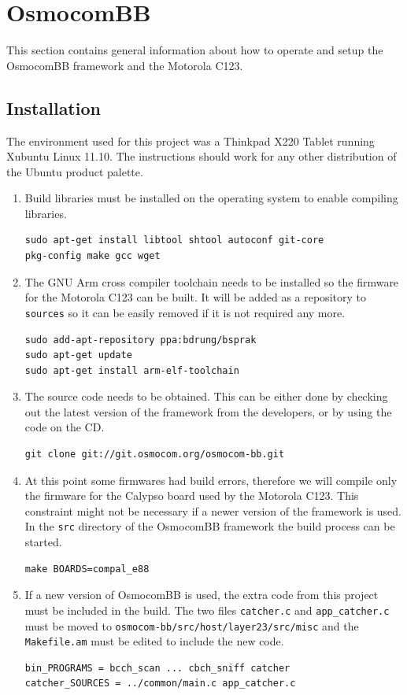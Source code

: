 \chapter{OsmocomBB}
This section contains general information about how to operate and setup the OsmocomBB framework and the Motorola C123.
\section{Installation}
\label{sec:osmo_install}
The environment used for this project was a Thinkpad X220 Tablet running Xubuntu Linux 11.10.
The instructions should work for any other distribution of the Ubuntu product palette.

\begin{enumerate}
	\item Build libraries must be installed on the operating system to enable compiling libraries.
	\begin{lstlisting}
sudo apt-get install libtool shtool autoconf git-core 
pkg-config make gcc wget
	\end{lstlisting}
	\item The GNU Arm cross compiler toolchain needs to be installed so the firmware for the Motorola C123 can be built.
	It will be added as a repository to \texttt{sources} so it can be easily removed if it is not required any more.
	\begin{lstlisting}
sudo add-apt-repository ppa:bdrung/bsprak
sudo apt-get update
sudo apt-get install arm-elf-toolchain
	\end{lstlisting}
	\item The source code needs to be obtained.
	This can be either done by checking out the latest version of the framework from the developers, or by using the code on the CD.
	\begin{lstlisting}
git clone git://git.osmocom.org/osmocom-bb.git
	\end{lstlisting}
	\item At this point some firmwares had build errors, therefore we will compile only the firmware for the Calypso board used by the Motorola C123.
	This constraint might not be necessary if a newer version of the framework is used.
	In the \texttt{src} directory of the OsmocomBB framework the build process can be started.
	\begin{lstlisting}
make BOARDS=compal_e88
	\end{lstlisting}
	\item If a new version of OsmocomBB is used, the extra code from this project must be included in the build.
	The two files \texttt{catcher.c} and \texttt{app\_catcher.c} must be moved to \texttt{osmocom-bb/src/host/layer23/src/misc} and the \texttt{Makefile.am} must be edited to include the new code.
	\begin{lstlisting}
bin_PROGRAMS = bcch_scan ... cbch_sniff catcher
catcher_SOURCES = ../common/main.c app_catcher.c
	\end{lstlisting}
\end{enumerate}

